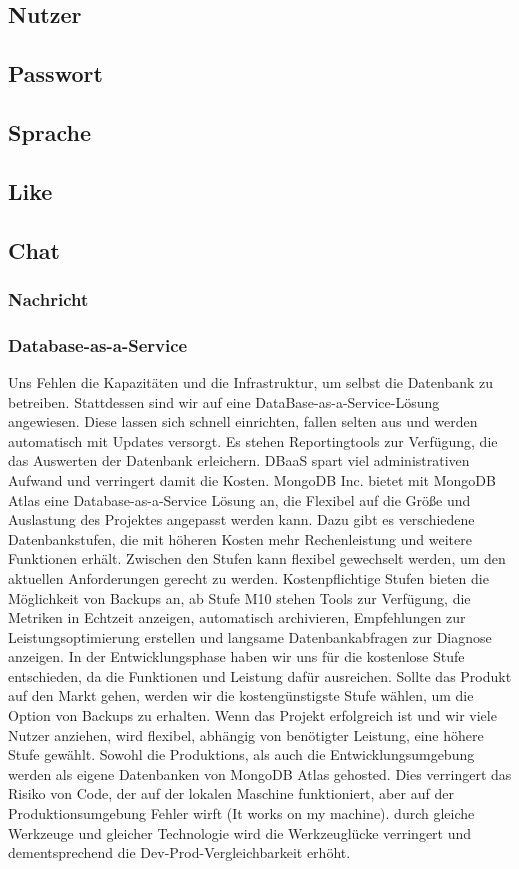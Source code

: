 \subsection{Nutzer}
\subsection{Passwort}
\subsection{Sprache}
\subsection{Like}
\subsection{Chat}
\subsubsection{Nachricht}

\subsubsection{Database-as-a-Service}
Uns Fehlen die Kapazitäten und die Infrastruktur, um selbst die Datenbank zu betreiben. Stattdessen sind wir auf eine DataBase-as-a-Service-Lösung angewiesen. Diese lassen sich schnell einrichten, fallen selten aus und werden automatisch mit Updates versorgt. Es stehen Reportingtools zur Verfügung, die das Auswerten der Datenbank erleichern. DBaaS spart viel administrativen Aufwand und verringert damit die Kosten.
MongoDB Inc. bietet mit MongoDB Atlas eine Database-as-a-Service Lösung an, die Flexibel auf die Größe und Auslastung des Projektes angepasst werden kann. Dazu gibt es verschiedene Datenbankstufen, die mit höheren Kosten mehr Rechenleistung und weitere Funktionen erhält. Zwischen den Stufen kann flexibel gewechselt werden, um den aktuellen Anforderungen gerecht zu werden. Kostenpflichtige Stufen bieten die Möglichkeit von Backups an, ab Stufe M10 stehen Tools zur Verfügung, die Metriken in Echtzeit anzeigen, automatisch archivieren, Empfehlungen zur Leistungsoptimierung erstellen und langsame Datenbankabfragen zur Diagnose anzeigen. In der Entwicklungsphase haben wir uns für die kostenlose Stufe entschieden, da die Funktionen und Leistung dafür ausreichen. Sollte das Produkt auf den Markt gehen, werden wir die kostengünstigste Stufe wählen, um die Option von Backups zu erhalten. Wenn das Projekt erfolgreich ist und wir viele Nutzer anziehen, wird flexibel, abhängig von benötigter Leistung, eine höhere Stufe gewählt.
Sowohl die Produktions, als auch die Entwicklungsumgebung werden als eigene Datenbanken von MongoDB Atlas gehosted. Dies verringert das Risiko von Code, der auf der lokalen Maschine funktioniert, aber auf der Produktionsumgebung Fehler wirft (\glqq It works on my machine\grqq). durch gleiche Werkzeuge und gleicher Technologie wird die Werkzeuglücke verringert und dementsprechend die Dev-Prod-Vergleichbarkeit erhöht. \cite{12FA1}

